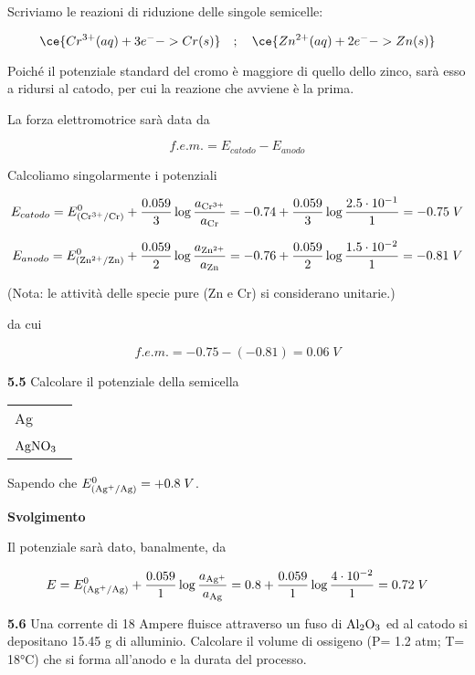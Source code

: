 \vspace{0.2cm}Scriviamo le reazioni di riduzione delle singole semicelle:

$$\ce{Cr^{3+}(aq) + 3 e^- -> Cr(s)}
\quad;\quad
\ce{Zn^{2+}(aq)  + 2 e^- -> Zn(s)}$$

Poiché il potenziale standard del cromo è maggiore di quello dello zinco, sarà esso a ridursi al catodo, per cui la reazione che avviene è la prima.

La forza elettromotrice sarà data da

$$f.e.m. = E_{catodo} - E_{anodo}$$

Calcoliamo singolarmente i potenziali

$$E_{catodo}
=E^0_{(\rm Cr^{3+}/Cr)} + \frac{0.059}{3} \log \frac{a_{\rm Cr^{3+}}}{a_{\rm Cr}}
=-0.74 + \frac{0.059}{3} \log \frac{2.5 \cdot 10^{-1}}{1}
=-0.75\;V$$

$$E_{anodo} = E^0_{(\rm Zn^{2+}/Zn)} + \frac{0.059}{2} \log \frac{a_{\rm Zn^{2+}}}{a_{\rm Zn}}
=-0.76 + \frac{0.059}{2} \log \frac{1.5 \cdot 10^{-2}}{1}
=-0.81\;V$$

(Nota: le attività delle specie pure (Zn e Cr) si considerano unitarie.)

da cui

$$f.e.m.=-0.75 - (-0.81) = 0.06\;V$$

\vspace{0.2cm}\textbf{5.5} Calcolare il potenziale della semicella 

\begin{center}
    \begin{tabular}{|p{3.7cm}|}
         Ag\\[0.5ex]
         $\rm AgNO_3$ \, \\[0.5ex]
    \end{tabular}
\end{center}

Sapendo che $E^{0}_{(\rm Ag^{+}/Ag)}=+0.8\;V$.

\vspace{0.2cm}\large\textbf{Svolgimento}\normalsize

\vspace{0.2cm}Il potenziale sarà dato, banalmente, da

$$E = E^0_{(\rm Ag^{+}/Ag)} + \frac{0.059}{1} \log \frac{a_{\rm Ag^{+}}}{a_{\rm Ag}}
=0.8 + \frac{0.059}{1} \log \frac{4 \cdot 10^{-2}}{1}
=0.72\;V$$

\vspace{0.2cm}\textbf{5.6} Una corrente di 18 Ampere fluisce attraverso un fuso di $\rm Al_2O_3$ ed al catodo si depositano 15.45 g di alluminio. Calcolare il volume di ossigeno (P= 1.2 atm; T= 18°C) che si forma all'anodo e la
durata del processo.


